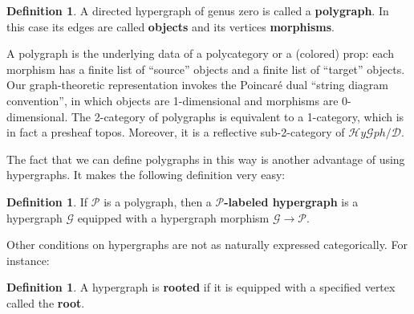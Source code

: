 \documentclass{article}
\theoremstyle{definition}
\newtheorem{defn}[thm]{Definition}
\theoremstyle{remark}
\def\P{\mathcal{P}}
\def\G{\mathcal{G}}
\def\hy{\mathcal{H}\mathit{y}\mathcal{G}\mathit{ph}}
\def\dhy{\mathcal{D}}
\begin{document}
\begin{defn}
  A directed hypergraph of genus zero is called a \textbf{polygraph}.
  In this case its edges are called \textbf{objects} and its vertices \textbf{morphisms}.
\end{defn}

A polygraph is the underlying data of a polycategory or a (colored) prop: each morphism has a finite list of ``source'' objects and a finite list of ``target'' objects.
Our graph-theoretic representation invokes the Poincar\'e dual ``string diagram convention'', in which objects are 1-dimensional and morphisms are 0-dimensional.
The 2-category of polygraphs is equivalent to a 1-category, which is in fact a presheaf topos.
Moreover, it is a reflective sub-2-category of $\hy/\dhy$.

The fact that we can define polygraphs in this way is another advantage of using hypergraphs.
It makes the following definition very easy:

\begin{defn}
  If $\P$ is a polygraph, then a \textbf{$\P$-labeled hypergraph} is a hypergraph $\G$ equipped with a hypergraph morphism $\G\to\P$.
\end{defn}

Other conditions on hypergraphs are not as naturally expressed categorically.
For instance:

\begin{defn}
  A hypergraph is \textbf{rooted} if it is equipped with a specified vertex called the \textbf{root}.
\end{defn}
\end{document}
